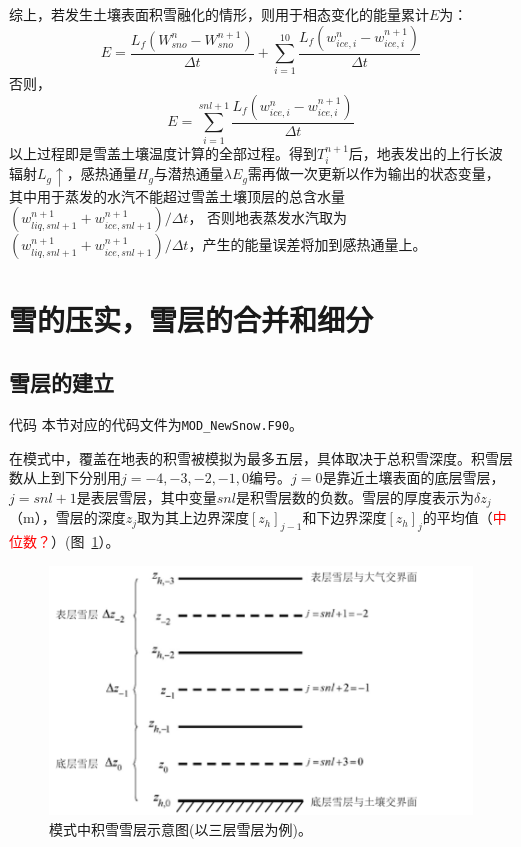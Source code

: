 综上，若发生土壤表面积雪融化的情形，则用于相态变化的能量累计$E$为：
\begin{equation}
E=\frac{L_{f}\left(W_{sno}^{n}-W_{sno}^{n+1}\right)}{\Delta t}+\sum_{i=1}^{10} \frac{L_{f}\left(w_{ice, i}^{n}-w_{ice, i}^{n+1}\right)}{\Delta t}
\end{equation}
否则，
\begin{equation}
E=\sum_{i=1}^{s n l+1} \frac{L_{f}\left(w_{ice, i}^{n}-w_{ice, i}^{n+1}\right)}{\Delta t}
\end{equation}
以上过程即是雪盖土壤温度计算的全部过程。得到$T_i^{n+1}$后，地表发出的上行长波辐射$L_g\uparrow$，感热通量$H_g$与潜热通量$\lambda E_g$需再做一次更新以作为输出的状态变量，
其中用于蒸发的水汽不能超过雪盖土壤顶层的总含水量$\left(w_{liq,snl+1}^{n+1}+w_{ice,snl+1}^{n+1}\right)/\Delta t$，
否则地表蒸发水汽取为$\left(w_{liq,snl+1}^{n+1}+w_{ice,snl+1}^{n+1}\right)/\Delta t$，产生的能量误差将加到感热通量上。

\section{雪的压实，雪层的合并和细分}
\subsection{雪层的建立}
\begin{mymdframed}{代码}
本节对应的代码文件为\texttt{MOD\_NewSnow.F90}。
\end{mymdframed}
在模式中，覆盖在地表的积雪被模拟为最多五层，具体取决于总积雪深度。积雪层数从上到下分别用$j = −4, −3, −2, −1, 0$编号。$j = 0$是靠近土壤表面的底层雪层，$j = snl + 1$是表层雪层，其中变量$snl$是积雪层数的负数。雪层的厚度表示为$\delta z_j$（m），雪层的深度$z_j$取为其上边界深度$\left[z_h\right]_{j-1}$和下边界深度$\left[z_h\right]_j$的平均值（\textcolor{red}{中位数？}）(图~\ref{fig:模式中积雪雪层示意图}）。
{
\begin{figure}[]
\centering
\includegraphics{Figures/雪盖土壤热力过程/模式中积雪雪层示意图.png}
\caption{模式中积雪雪层示意图(以三层雪层为例)。}
\label{fig:模式中积雪雪层示意图}
\end{figure}
}

